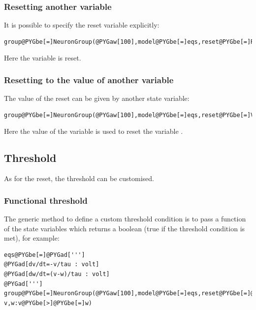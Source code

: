 \documentclass[letterpaper,10pt]{manual}
\begin{document}
\subsubsection{Resetting another variable}

It is possible to specify the reset variable explicitly:

\begin{Verbatim}[commandchars=@\[\]]
group@PYGbe[=]NeuronGroup(@PYGaw[100],model@PYGbe[=]eqs,reset@PYGbe[=]Reset(@PYGaw[0]@PYGbe[*]mV,state@PYGbe[=]@PYGad[']@PYGad[w]@PYGad[']),threshold@PYGbe[=]@PYGaw[10]@PYGbe[*]mV)
\end{Verbatim}

Here the variable  is reset.


\subsubsection{Resetting to the value of another variable}

The value of the reset can be given by another state variable:

\begin{Verbatim}[commandchars=@\[\]]
group@PYGbe[=]NeuronGroup(@PYGaw[100],model@PYGbe[=]eqs,reset@PYGbe[=]VariableReset(@PYGaw[0]@PYGbe[*]mV,state@PYGbe[=]@PYGad[']@PYGad[v]@PYGad['],resetvaluestate@PYGbe[=]@PYGad[']@PYGad[w]@PYGad[']),threshold@PYGbe[=]@PYGaw[10]@PYGbe[*]mV)
\end{Verbatim}

Here the value of the variable  is used to reset the variable .


\subsection{Threshold}

As for the reset, the threshold can be customised.


\subsubsection{Functional threshold}

The generic method to define a custom threshold condition is to pass a function of the
state variables which returns a boolean (true if the threshold condition is met), for example:

\begin{Verbatim}[commandchars=@\[\]]
eqs@PYGbe[=]@PYGad[''']
@PYGad[dv/dt=-v/tau : volt]
@PYGad[dw/dt=(v-w)/tau : volt]
@PYGad[''']
group@PYGbe[=]NeuronGroup(@PYGaw[100],model@PYGbe[=]eqs,reset@PYGbe[=]@PYGaw[0]@PYGbe[*]mV,threshold@PYGbe[=]@PYGay[lambda] v,w:v@PYGbe[>]@PYGbe[=]w)
\end{Verbatim}
\end{document}
